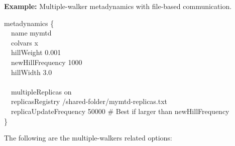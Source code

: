 \noindent\textbf{Example:} Multiple-walker metadynamics with file-based communication.\\
\begin{cvexampleinput}
\-metadynamics \{\\
\-\-~~name mymtd\\
\-\-~~colvars x\\
\-\-~~hillWeight 0.001\\
\-\-~~newHillFrequency 1000\\
\-\-~~hillWidth 3.0\\
\-\-~~\\
\-\-~~multipleReplicas       on\\
\-\-~~replicasRegistry       /shared-folder/mymtd-replicas.txt\\
\-\-~~replicaUpdateFrequency 50000  \# Best if larger than newHillFrequency\\
\-\}
\end{cvexampleinput}

The following are the multiple-walkers related options:

